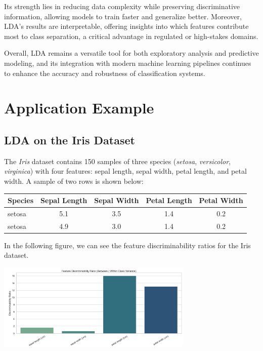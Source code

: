 \documentclass[12pt,a4paper]{article}
\begin{document}
Its strength lies in reducing data complexity while preserving discriminative information, allowing models to train faster and generalize better. Moreover, LDA's results are interpretable, offering insights into which features contribute most to class separation, a critical advantage in regulated or high-stakes domains.

Overall, LDA remains a versatile tool for both exploratory analysis and predictive modeling, and its integration with modern machine learning pipelines continues to enhance the accuracy and robustness of classification systems.

\section{Application Example}
\subsection{LDA on the Iris Dataset}

The \textit{Iris} dataset contains 150 samples of three species (\textit{setosa}, \textit{versicolor}, \textit{virginica}) with four features: sepal length, sepal width, petal length, and petal width. A sample of two rows is shown below:
\begin{table}[h!]
\centering
\begin{tabular}{lcccc}
\hline
Species & Sepal Length & Sepal Width & Petal Length & Petal Width \\
\hline
setosa & 5.1 & 3.5 & 1.4 & 0.2 \\
setosa & 4.9 & 3.0 & 1.4 & 0.2 \\
\hline
\end{tabular}
\end{table}

In the following figure, we can see the feature discriminability ratios for the Iris dataset.

\begin{center}
    \includegraphics[width=0.7\textwidth]{images/irish_ratio.png}
\end{center}
\end{document}
